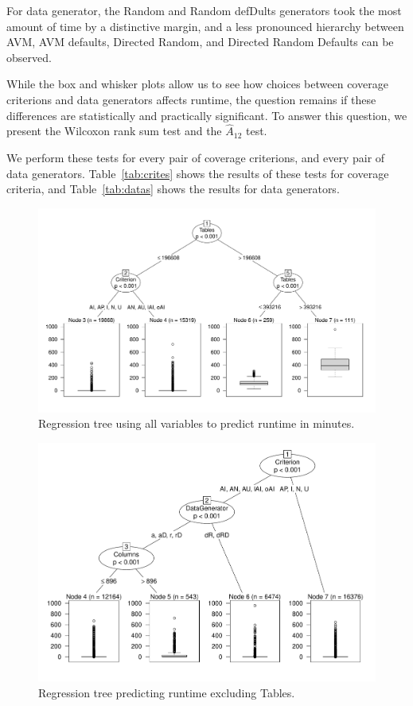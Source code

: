 For data generator, the Random and Random defDults generators took the
most amount of time by a distinctive margin, and a less pronounced
hierarchy between AVM, AVM defaults, Directed Random, and Directed
Random Defaults can be observed.  

While the box and whisker plots allow us to see how choices between
coverage criterions and data generators affects runtime, the question
remains if these differences are statistically and practically
significant. To answer this question, we present the Wilcoxon rank sum
test and the $\hat{A}_{12}$ test.  


We perform these tests for every pair
of coverage criterions, and every pair of data generators.
Table~\ref{tab:crites} shows the results of these tests for coverage
criteria, and Table~\ref{tab:datas} shows the results for data
generators.

\begin{figure}
\centering
  \centering
  \includegraphics[width=.75\linewidth]{../diagrams/AllTree.pdf}
  \caption{Regression tree using all variables to predict runtime in
  minutes. \vspace{-.15in}}
  \label{fig:atree}
  \vspace{-.15in} 
\end{figure}

\begin{figure}
\centering
  \centering
  \includegraphics[width=.75\linewidth]{../diagrams/NoTableCtreesd.pdf}
  \caption{Regression tree predicting runtime excluding Tables.\vspace{-.15in}}
  \label{fig:ttree}
  \vspace{-.15in} 
\end{figure}


